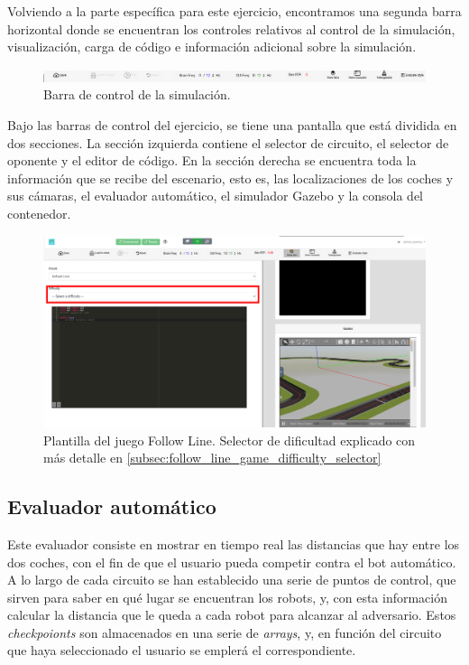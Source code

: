 \documentclass[a4paper, 12pt]{book}
\begin{document}
Volviendo a la parte específica para este ejercicio, encontramos una segunda barra horizontal donde se encuentran los controles relativos al control de la simulación, visualización, carga de código e información adicional sobre la simulación.

\begin{figure}[H]
	\centering
    \includegraphics[width=15cm]{img/barra_control.png}
    \caption{Barra de control de la simulación.}
\end{figure}

Bajo las barras de control del ejercicio, se tiene una pantalla que está dividida en dos secciones. La sección izquierda contiene el selector de circuito, el selector de oponente y el editor de código. En la sección derecha se encuentra toda la información que se recibe del escenario, esto es, las localizaciones de los coches y sus cámaras, el evaluador automático, el simulador Gazebo y la consola del contenedor.


\begin{figure}[H]
	\centering
    \includegraphics[width=15cm]{img/follow_line_game.png}
    \caption{Plantilla del juego Follow Line. Selector de dificultad explicado con más detalle en \ref{subsec:follow_line_game_difficulty_selector}}
\end{figure}

\subsection{Evaluador automático}
\label{follow_line_game_evaluator}

Este evaluador consiste en mostrar en tiempo real las distancias que hay entre los dos coches, con el fin de que el usuario pueda competir contra el bot automático. A lo largo de cada circuito se han establecido una serie de puntos de control, que sirven para saber en qué lugar se encuentran los robots, y, con esta información calcular la distancia que le queda a cada robot para alcanzar al adversario. Estos \emph{checkpoionts} son almacenados en una serie de \emph{arrays}, y, en función del circuito que haya seleccionado el usuario se emplerá el correspondiente.
\end{document}
